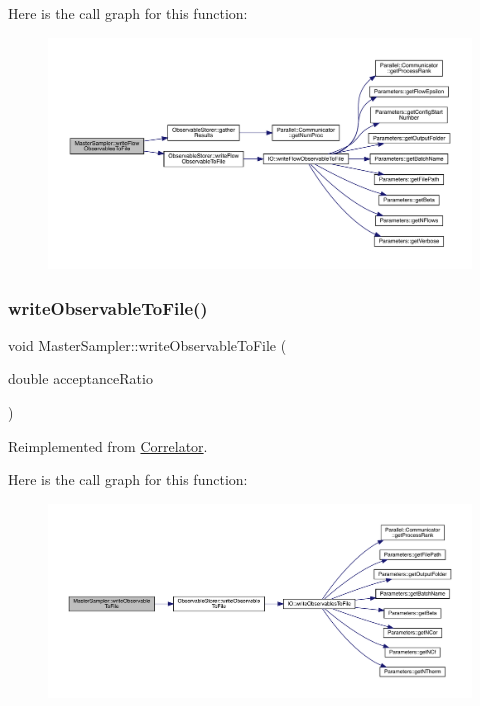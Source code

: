 Here is the call graph for this function\+:\nopagebreak
\begin{figure}[H]
\begin{center}
\leavevmode
\includegraphics[width=350pt]{class_master_sampler_ad475928217ac61fae134128904aaa9f8_cgraph}
\end{center}
\end{figure}
\mbox{\label{class_master_sampler_a638714c38e1a6252ab8b6be1fa224bd4}} 
\subsubsection{\texorpdfstring{writeObservableToFile()}{writeObservableToFile()}}
{\footnotesize\ttfamily void Master\+Sampler\+::write\+Observable\+To\+File (\begin{DoxyParamCaption}\item[{double}]{acceptance\+Ratio }\end{DoxyParamCaption})\hspace{0.3cm}{\ttfamily [virtual]}}



Reimplemented from \mbox{\hyperlink{class_correlator_a9e8d80e30e4fbe3b7fe57521538cb5ff}{Correlator}}.

Here is the call graph for this function\+:\nopagebreak
\begin{figure}[H]
\begin{center}
\leavevmode
\includegraphics[width=350pt]{class_master_sampler_a638714c38e1a6252ab8b6be1fa224bd4_cgraph}
\end{center}
\end{figure}


